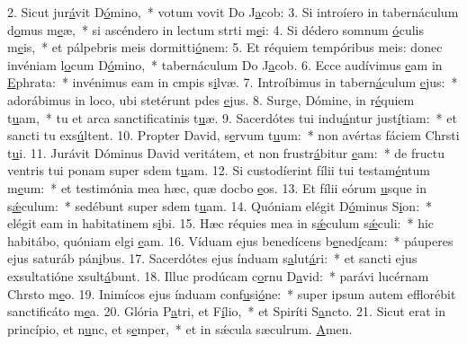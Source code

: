 2. Sicut jur\uline{á}vit D\uline{ó}mino,~* votum vovit Do J\uline{a}cob:
3. Si introíero in tabernáculum d\uline{o}mus m\uline{e}æ,~* si ascéndero in lectum strti m\uline{e}i:
4. Si dédero somnum \uline{ó}culis m\uline{e}is,~* et pálpebris meis dormitti\uline{ó}nem:
5. Et réquiem tempóribus meis: donec invéniam l\uline{o}cum D\uline{ó}mino,~* tabernáculum Do J\uline{a}cob.
6. Ecce audívimus \uline{e}am in \uline{E}phrata:~* invénimus eam in cmpis s\uline{i}lvæ.
7. Introíbimus in tabern\uline{á}culum \uline{e}jus:~* adorábimus in loco, ubi stetérunt pdes \uline{e}jus.
8. Surge, Dómine, in r\uline{é}quiem t\uline{u}am,~* tu et arca sanctificatinis t\uline{u}æ.
9. Sacerdótes tui indu\uline{á}ntur just\uline{í}tiam:~* et sancti tu exs\uline{ú}ltent.
10. Propter David, s\uline{e}rvum t\uline{u}um:~* non avértas fáciem Chrsti t\uline{u}i.
11. Jurávit Dóminus David veritátem, et non frustr\uline{á}bitur \uline{e}am:~* de fructu ventris tui ponam super sdem t\uline{u}am.
12. Si custodíerint fílii tui testam\uline{é}ntum m\uline{e}um:~* et testimónia mea hæc, quæ docbo \uline{e}os.
13. Et fílii eórum \uline{u}sque in s\uline{ǽ}culum:~* sedébunt super sdem t\uline{u}am.
14. Quóniam elégit D\uline{ó}minus S\uline{i}on:~* elégit eam in habitatinem s\uline{i}bi.
15. Hæc réquies mea in s\uline{ǽ}culum s\uline{ǽ}culi:~* hic habitábo, quóniam elgi \uline{e}am.
16. Víduam ejus benedícens b\uline{e}ned\uline{í}cam:~* páuperes ejus saturáb pán\uline{i}bus.
17. Sacerdótes ejus índuam s\uline{a}lut\uline{á}ri:~* et sancti ejus exsultatióne xsult\uline{á}bunt.
18. Illuc prodúcam c\uline{o}rnu D\uline{a}vid:~* parávi lucérnam Chrsto m\uline{e}o.
19. Inimícos ejus índuam conf\uline{u}si\uline{ó}ne:~* super ipsum autem efflorébit sanctificáto m\uline{e}a.
20. Glória P\uline{a}tri, et F\uline{í}lio,~* et Spiríti S\uline{a}ncto.
21. Sicut erat in princípio, et n\uline{u}nc, et s\uline{e}mper,~* et in sǽcula sæculrum. \uline{A}men.
